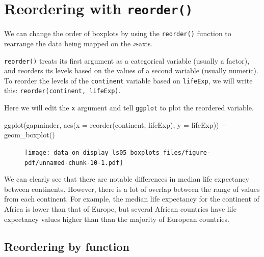 \documentclass[
  letterpaper,
  DIV=11,
  numbers=noendperiod]{scrreprt}
\newenvironment{Shaded}{\begin{snugshade}}{\end{snugshade}}
\newcommand{\AttributeTok}[1]{\textcolor[rgb]{0.40,0.45,0.13}{#1}}
\newcommand{\FunctionTok}[1]{\textcolor[rgb]{0.28,0.35,0.67}{#1}}
\newcommand{\NormalTok}[1]{\textcolor[rgb]{0.00,0.23,0.31}{#1}}
\newcommand{\SpecialCharTok}[1]{\textcolor[rgb]{0.37,0.37,0.37}{#1}}
\begin{document}
\hypertarget{reordering-with-reorder}{%
\section{\texorpdfstring{Reordering with
\texttt{reorder()}}{Reordering with reorder()}}\label{reordering-with-reorder}}

We can change the order of boxplots by using the \texttt{reorder()}
function to rearrange the data being mapped on the \emph{x}-axis.

\texttt{reorder()} treats its first argument as a categorical variable
(usually a factor), and reorders its levels based on the values of a
second variable (usually numeric). To reorder the levels of the
\texttt{continent} variable based on \texttt{lifeExp}, we will write
this: \texttt{reorder(continent,\ lifeExp)}.

Here we will edit the \texttt{x} argument and tell \texttt{ggplot} to
plot the reordered variable.

\begin{Shaded}
\begin{Highlighting}[]
\FunctionTok{ggplot}\NormalTok{(gapminder, }
       \FunctionTok{aes}\NormalTok{(}\AttributeTok{x =} \FunctionTok{reorder}\NormalTok{(continent, lifeExp), }
           \AttributeTok{y =}\NormalTok{ lifeExp)) }\SpecialCharTok{+}
  \FunctionTok{geom\_boxplot}\NormalTok{()}
\end{Highlighting}
\end{Shaded}

\begin{figure}[H]

{\centering \texttt{[image: data\_on\_display\_ls05\_boxplots\_files/figure-pdf/unnamed-chunk-10-1.pdf]}

}

\end{figure}

We can clearly see that there are notable differences in median life
expectancy between continents. However, there is a lot of overlap
between the range of values from each continent. For example, the median
life expectancy for the continent of Africa is lower than that of
Europe, but several African countries have life expectancy values higher
than than the majority of European countries.

\hypertarget{reordering-by-function}{%
\subsection{Reordering by function}\label{reordering-by-function}}
\end{document}
